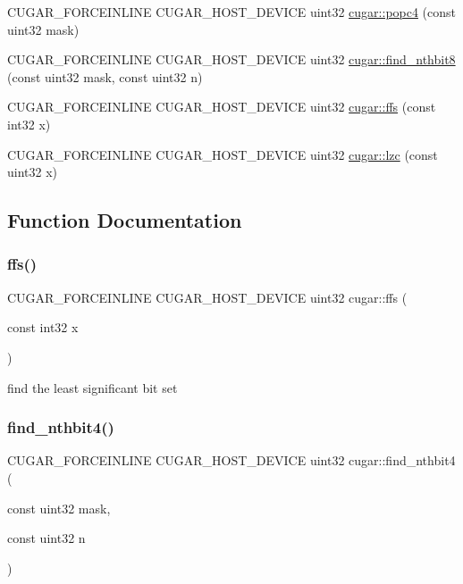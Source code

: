 \begin{DoxyCompactItemize}
\item 
C\+U\+G\+A\+R\+\_\+\+F\+O\+R\+C\+E\+I\+N\+L\+I\+NE C\+U\+G\+A\+R\+\_\+\+H\+O\+S\+T\+\_\+\+D\+E\+V\+I\+CE uint32 \hyperlink{group___bits_module_ga4bc7fb7acba5b770553c58bfae69f5af}{cugar\+::popc4} (const uint32 mask)
\item 
C\+U\+G\+A\+R\+\_\+\+F\+O\+R\+C\+E\+I\+N\+L\+I\+NE C\+U\+G\+A\+R\+\_\+\+H\+O\+S\+T\+\_\+\+D\+E\+V\+I\+CE uint32 \hyperlink{group___bits_module_ga38b135612da4fe8202152a56dc9b9508}{cugar\+::find\+\_\+nthbit8} (const uint32 mask, const uint32 n)
\item 
C\+U\+G\+A\+R\+\_\+\+F\+O\+R\+C\+E\+I\+N\+L\+I\+NE C\+U\+G\+A\+R\+\_\+\+H\+O\+S\+T\+\_\+\+D\+E\+V\+I\+CE uint32 \hyperlink{group___bits_module_ga68f09d26fa95c119a5263f856365db42}{cugar\+::ffs} (const int32 x)
\item 
C\+U\+G\+A\+R\+\_\+\+F\+O\+R\+C\+E\+I\+N\+L\+I\+NE C\+U\+G\+A\+R\+\_\+\+H\+O\+S\+T\+\_\+\+D\+E\+V\+I\+CE uint32 \hyperlink{group___bits_module_gad2be8d91a93a10a6a9601f4f89bf752b}{cugar\+::lzc} (const uint32 x)
\end{DoxyCompactItemize}


\subsection{Function Documentation}
\mbox{\label{group___bits_module_ga68f09d26fa95c119a5263f856365db42}} 
\subsubsection{\texorpdfstring{ffs()}{ffs()}}
{\footnotesize\ttfamily C\+U\+G\+A\+R\+\_\+\+F\+O\+R\+C\+E\+I\+N\+L\+I\+NE C\+U\+G\+A\+R\+\_\+\+H\+O\+S\+T\+\_\+\+D\+E\+V\+I\+CE uint32 cugar\+::ffs (\begin{DoxyParamCaption}\item[{const int32}]{x }\end{DoxyParamCaption})}

find the least significant bit set \mbox{\label{group___bits_module_ga7f02d582847e11ea8454216ad36dc77b}} 
\subsubsection{\texorpdfstring{find\+\_\+nthbit4()}{find\_nthbit4()}}
{\footnotesize\ttfamily C\+U\+G\+A\+R\+\_\+\+F\+O\+R\+C\+E\+I\+N\+L\+I\+NE C\+U\+G\+A\+R\+\_\+\+H\+O\+S\+T\+\_\+\+D\+E\+V\+I\+CE uint32 cugar\+::find\+\_\+nthbit4 (\begin{DoxyParamCaption}\item[{const uint32}]{mask,  }\item[{const uint32}]{n }\end{DoxyParamCaption})}

